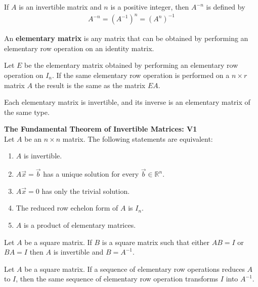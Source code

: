 \documentclass{article}
\begin{document}
\begin{definition}
    If $A$ is an invertible matrix and $n$ is a positive integer, then $A^{-n}$ is defined by
    \begin{gather*}
        A^{-n} = (A^{-1})^n = (A^n)^{-1}
    \end{gather*}
\end{definition}
\begin{definition}
    An \textbf{elementary matrix} is any matrix that can be obtained by performing an elementary row operation on an identity matrix.
\end{definition}
\begin{theorem}
    Let $E$ be the elementary matrix obtained by performing an elementary row operation on $I_n$. If the same elementary row operation is performed on a $n\times r$ matrix $A$ the result is the same as the matrix $EA$.
\end{theorem}
\begin{theorem}
    Each elementary matrix is invertible, and its inverse is an elementary matrix of the same type.
\end{theorem}
\begin{theorem}
    \textbf{The Fundamental Theorem of Invertible Matrices: V1}\\
    Let $A$ be an $n\times n$ matrix. The following statements are equivalent:
    \begin{enumerate}
        \item $A$ is invertible.
        \item $A\vec x = \vec b$ has a unique solution for every $\vec b\in\mathbb{R}^n$.
        \item $A\vec x = 0$ has only the trivial solution.
        \item The reduced row echelon form of $A$ is $I_n$.
        \item $A$ is a product of elementary matrices.
    \end{enumerate}
\end{theorem}
\begin{theorem}
    Let $A$ be a square matrix. If $B$ is a square matrix such that either $AB=I$ or $BA=I$ then $A$ is invertible and $B=A^{-1}$.
\end{theorem}
\begin{theorem}
    Let $A$ be a square matrix. If a sequence of elementary row operations reduces $A$ to $I$, then the same sequence of elementary row operation transforms $I$ into $A^{-1}$.
\end{theorem}
\end{document}
